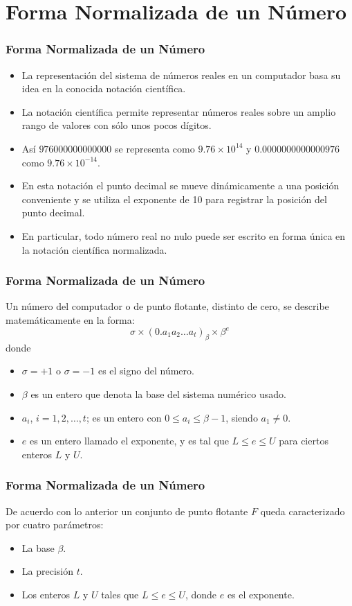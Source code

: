 \documentclass{beamer}
\begin{document}
\section{Forma Normalizada de un N\'umero}
\begin{frame}
  \frametitle{Forma Normalizada de un N\'umero}
  \begin{itemize}
    \item La representaci\'on del sistema de n\'umeros reales en un computador basa su idea en la conocida notaci\'on cient\'ifica. 
    \item<2-> La notaci\'on cient\'ifica permite representar n\'umeros reales sobre un amplio rango de valores con
    s\'olo unos pocos d\'igitos. 
    \item<3-> As\'i $976000000000000$ se representa como $9.76 \times 10^{14}$ y $0.0000000000000976$ como $9.76 \times 10^{-14}$. 
    \item<4-> En esta notaci\'on el punto decimal se mueve din\'amicamente a una posici\'on conveniente
    y se utiliza el exponente de 10 para registrar la posici\'on del punto decimal. 
    \item<5-> En particular, todo n\'umero real no  nulo puede ser escrito en forma \'unica en la notaci\'on cient\'ifica normalizada.
  \end{itemize}
  
  
  

\end{frame}
\frame
{
\frametitle{Forma Normalizada de un N\'umero}
Un n\'umero del computador o de punto flotante, distinto de cero, se describe matem\'aticamente en la forma:
$$
\sigma\times(0.a_1a_2\ldots a_t)_{\beta}\times\beta^e
$$
donde
\begin{itemize}
 \item<2->  $\sigma=+1$ o $\sigma=-1$ es el signo del n\'umero.
\item<3->  $\beta$ es un entero que denota la base del sistema num\'erico usado.
\item<4->  $a_i$, $i = 1,2,\ldots,t$; es un entero con $0\leq a_i \leq \beta-1$, siendo $a_1 \neq 0$.
\item<5->  $e$ es un entero llamado el exponente, y es tal que $L\leq e\leq U$ para ciertos enteros $L$ y $U$.
\end{itemize}
}
\frame
{
\frametitle{Forma Normalizada de un N\'umero}
De acuerdo con lo anterior un conjunto de punto flotante $F$ queda caracterizado por cuatro par\'ametros:
\begin{itemize}
 \item  La base $\beta$.
\item La precisi\'on $t$.
\item  Los enteros $L$ y $U$ tales que $L \leq e \leq U$, donde $e$ es el exponente.
\end{itemize}
}
\end{document}
